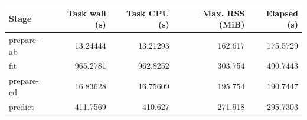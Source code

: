 \begin{tabular}{lrrrr}
\toprule
Stage & Task wall (s) & Task CPU (s) & Max. RSS (MiB) & Elapsed (s) \\
\midrule
prepare-ab & 13.24444 & 13.21293 & 162.617 & 175.5729 \\
fit & 965.2781 & 962.8252 & 303.754 & 490.7443 \\
prepare-cd & 16.83628 & 16.75609 & 195.754 & 190.7447 \\
predict & 411.7569 & 410.627 & 271.918 & 295.7303 \\
\bottomrule
\end{tabular}
